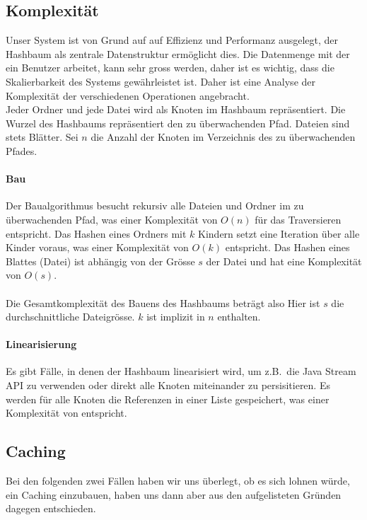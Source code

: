 \documentclass[a4paper,12pt]{report}
\begin{document}
    \subsection{Komplexität}

    Unser System ist von Grund auf auf Effizienz und Performanz ausgelegt, der Hashbaum als zentrale Datenstruktur ermöglicht dies.
    Die Datenmenge mit der ein Benutzer arbeitet, kann sehr gross werden, daher ist es wichtig, dass die Skalierbarkeit des Systems gewährleistet ist.
    Daher ist eine Analyse der Komplexität der verschiedenen Operationen angebracht.
    \\
    Jeder Ordner und jede Datei wird als Knoten im Hashbaum repräsentiert.
    Die Wurzel des Hashbaums repräsentiert den zu überwachenden Pfad.
    Dateien sind stets Blätter.\newline
    Sei $n$ die Anzahl der Knoten im Verzeichnis des zu überwachenden Pfades.

    \paragraph{Bau}
    Der Baualgorithmus besucht rekursiv alle Dateien und Ordner im zu überwachenden Pfad,
    was einer Komplexität von $O(n)$ für das Traversieren entspricht.
    Das Hashen eines Ordners mit $k$ Kindern setzt eine Iteration über alle Kinder voraus, was einer Komplexität von $O(k)$ entspricht.
    Das Hashen eines Blattes (Datei) ist abhängig von der Grösse $s$ der Datei und hat eine Komplexität von $O(s)$.
    \\\\
    Die Gesamtkomplexität des Bauens des Hashbaums beträgt also 
    Hier ist $s$ die durchschnittliche Dateigrösse. $k$ ist implizit in $n$ enthalten.

    \paragraph{Linearisierung}
    Es gibt Fälle, in denen der Hashbaum linearisiert wird, um z.B.\ die Java Stream API zu verwenden oder direkt alle Knoten miteinander zu persisitieren.
    Es werden für alle Knoten die Referenzen in einer Liste gespeichert, was einer Komplexität von   entspricht.

    \subsection{Caching}
    Bei den folgenden zwei Fällen haben wir uns überlegt, ob es sich lohnen würde, ein Caching einzubauen,
    haben uns dann aber aus den aufgelisteten Gründen dagegen entschieden.
\end{document}
